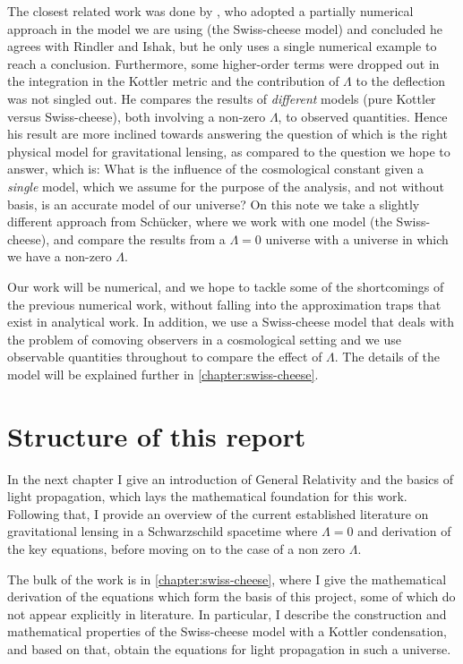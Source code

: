 The closest related work was done by \citet{schucker2009strong}, who adopted a partially numerical approach in the model we are using (the Swiss-cheese model) and concluded he agrees with Rindler and Ishak, but he only uses a single numerical example to reach a conclusion. Furthermore, some higher-order terms were dropped out in the integration in the Kottler metric and the contribution of $\Lambda$ to the deflection was not singled out. He compares the results of \emph{different} models (pure Kottler versus Swiss-cheese), both involving a non-zero $\Lambda$, to observed quantities. Hence his result are more inclined towards answering the question of which is the right physical model for gravitational lensing, as compared to the question we hope to answer, which is: What is the influence of the cosmological constant given a \emph{single} model, which we assume for the purpose of the analysis, and not without basis, is an accurate model of our universe? On this note we take a slightly different approach from Sch{\"u}cker, where we work with one model (the Swiss-cheese), and compare the results from a $\Lambda = 0$ universe with a universe in which we have a non-zero $\Lambda$. 

Our work will be numerical, and we hope to tackle some of the shortcomings of the previous numerical work, without falling into the approximation traps that exist in analytical work. In addition, we use a Swiss-cheese model that deals with the problem of comoving observers in a cosmological setting and we use observable quantities throughout to compare the effect of $\Lambda$. The details of the model will be explained further in \autoref{chapter:swiss-cheese}.

\section{Structure of this report}
In the next chapter I give an introduction of General Relativity and the basics of light propagation, which lays the mathematical foundation for this work. Following that, I provide an overview of the current established literature on gravitational lensing in a Schwarzschild spacetime where $\Lambda = 0$ and derivation of the key equations, before moving on to the case of a non zero $\Lambda$. 

The bulk of the work is in \autoref{chapter:swiss-cheese}, where I give the mathematical derivation of the equations which form the basis of this project, some of which do not appear explicitly in literature. In particular, I describe the construction and mathematical properties of the Swiss-cheese model with a Kottler condensation, and based on that, obtain the equations for light propagation in such a universe. 

